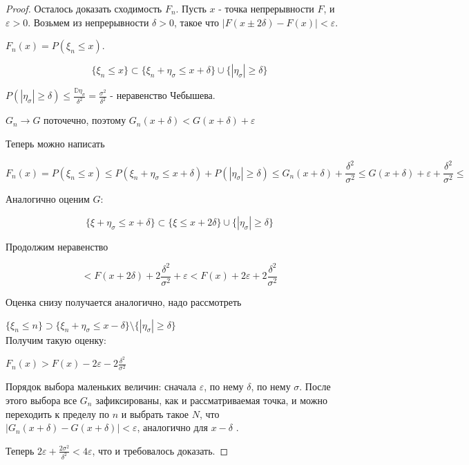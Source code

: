 \begin{proof}
    Осталось доказать сходимость $F_n$. Пусть $x$ - точка непрерывности $F$, и $\varepsilon > 0$. Возьмем из непрерывности $\delta > 0$, такое что $|F(x \pm 2\delta) - F(x)| < \varepsilon$.
    
    $F_n(x) = P(\xi_n \leq x)$. 
    
    \[ \{\xi_n \leq x\} \subset \{\xi_n + \eta_\sigma \leq x + \delta \} \cup \{ |\eta_\sigma| \geq \delta\}\]

    $P(|\eta_\sigma| \geq \delta) \leq \frac{\mathbb{D} \eta_\sigma}{\delta^2} = \frac{\sigma^2}{\delta^2}$ - неравенство Чебышева.
    
    $G_n \to G$ поточечно, поэтому $G_n(x + \delta) < G(x+\delta) + \varepsilon$
    
    Теперь можно написать
    
    \[  F_n(x) = P(\xi_n \leq x) \leq P(\xi_n + \eta_\sigma \leq x + \delta) + P(|\eta_\sigma| \geq \delta) \leq G_n(x+\delta) + \frac{\delta^2}{\sigma^2} \leq G(x+\delta) + \varepsilon +  \frac{\delta^2}{\sigma^2} \leq
    \]
    
    Аналогично оценим $G$:
    
    \[ \{\xi + \eta_\sigma \leq x + \delta\} \subset \{\xi \leq x + 2\delta \} \cup \{ |\eta_\sigma| \geq \delta\}
    \]
    
    Продолжим неравенство
    
    \[ < F(x + 2\delta) + 2\frac{\delta^2}{\sigma^2} + \varepsilon < F(x) + 2\varepsilon + 2\frac{\delta^2}{\sigma^2}
    \]
    
    
    Оценка снизу получается аналогично, надо рассмотреть
    
    $\{\xi_n \leq n\} \supset \{\xi_n + \eta_\sigma \leq x - \delta\} \setminus \{|\eta_\sigma| \geq \delta\}$\\
    
    Получим такую оценку:
    
    $F_n(x) > F(x) - 2\varepsilon - 2\frac{\delta^2}{\sigma^2}$
    
    Порядок выбора маленьких величин: сначала $\varepsilon$, по нему $\delta$, по нему $\sigma$. После этого выбора все $G_n$ зафиксированы, как и рассматриваемая точка, и можно переходить к пределу по $n$ и выбрать такое $N$, что $|G_n(x+\delta) - G(x + \delta)| < \varepsilon$, аналогично для $x-\delta$ .
    
    Теперь $2\varepsilon + \frac{2\sigma^2}{\delta^2} < 4\varepsilon$, что и требовалось доказать.
    
\end{proof}
\newpage
